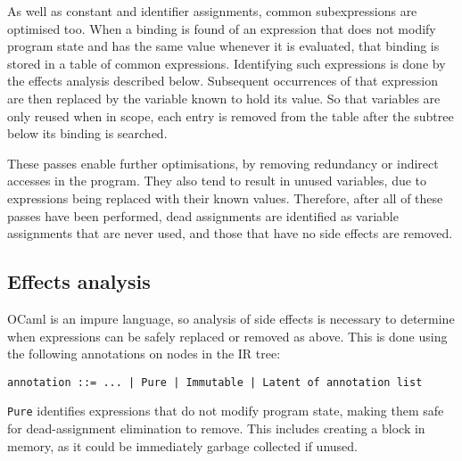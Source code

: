 
As well as constant and identifier assignments, common subexpressions are optimised too. When a binding is found of an expression that does not modify program state and has the same value whenever it is evaluated, that binding is stored in a table of common expressions. Identifying such expressions is done by the effects analysis described below. 
Subsequent occurrences of that expression are then replaced by the variable known to hold its value. So that variables are only reused when in scope, each entry is removed from the table after the subtree below its binding is searched.

These passes enable further optimisations, by removing redundancy or indirect accesses in the program. They also tend to result in unused variables, due to expressions being replaced with their known values.  Therefore, after all of these passes have been performed,  dead assignments are identified as variable assignments that are never used, and those that have no side effects are removed.



\subsection{Effects analysis}
OCaml is an impure language, so analysis of side effects is necessary to determine when expressions can be safely replaced or removed as above. This is done using the following annotations on nodes in the IR tree:

\verb"annotation ::= ... | Pure | Immutable | Latent of annotation list"

\verb|Pure| identifies expressions that do not modify program state, making them safe for dead-assignment elimination to remove. This includes creating a block in memory, as it could be immediately garbage collected if unused.

